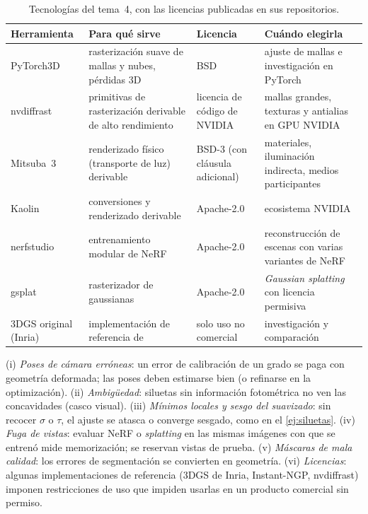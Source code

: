 \begin{table}[h]
\centering\small
\begin{tabularx}{\textwidth}{@{}l>{\raggedright\arraybackslash}X>{\raggedright\arraybackslash}p{2.9cm}>{\raggedright\arraybackslash}X@{}}
\toprule
Herramienta & Para qué sirve & Licencia & Cuándo elegirla \\
\midrule
PyTorch3D & rasterización suave de mallas y nubes, pérdidas 3D & BSD & ajuste de mallas e investigación en PyTorch \\
nvdiffrast & primitivas de rasterización derivable de alto rendimiento & licencia de código de NVIDIA & mallas grandes, texturas y antialias en GPU NVIDIA \\
Mitsuba~3 & renderizado físico (transporte de luz) derivable & BSD-3 (con cláusula adicional) & materiales, iluminación indirecta, medios participantes \\
Kaolin & conversiones y renderizado derivable & Apache-2.0 & ecosistema NVIDIA \\
nerfstudio & entrenamiento modular de NeRF & Apache-2.0 & reconstrucción de escenas con varias variantes de NeRF \\
gsplat & rasterizador de gaussianas & Apache-2.0 & \emph{Gaussian splatting} con licencia permisiva \\
3DGS original (Inria) & implementación de referencia de~\cite{gs} & solo uso no comercial & investigación y comparación \\
\bottomrule
\end{tabularx}
\caption{Tecnologías del tema~4, con las licencias publicadas en sus repositorios.}
\label{tab:tec4}
\end{table}

\begin{observacion}\label{obs:errores4}
(i) \emph{Poses de cámara erróneas}: un error de calibración de un grado se paga con geometría deformada; las poses deben estimarse bien (o refinarse en la optimización). (ii) \emph{Ambigüedad}: siluetas sin información fotométrica no ven las concavidades (casco visual). (iii) \emph{Mínimos locales y sesgo del suavizado}: sin recocer $\sigma$ o $\tau$, el ajuste se atasca o converge sesgado, como en el \cref{ej:siluetas}. (iv) \emph{Fuga de vistas}: evaluar NeRF o \emph{splatting} en las mismas imágenes con que se entrenó mide memorización; se reservan vistas de prueba. (v) \emph{Máscaras de mala calidad}: los errores de segmentación se convierten en geometría. (vi) \emph{Licencias}: algunas implementaciones de referencia (3DGS de Inria, Instant-NGP, nvdiffrast) imponen restricciones de uso que impiden usarlas en un producto comercial sin permiso.
\end{observacion}

